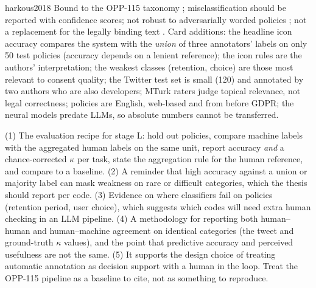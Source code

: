 \begin{papercard}{harkous2018}
 Bound to the OPP-115 taxonomy ; misclassification should be reported with confidence scores; not robust to adversarially worded policies ; not a replacement for the legally binding text . Card additions: the headline icon accuracy compares the system with the \emph{union} of three annotators' labels on only 50 test policies (accuracy depends on a lenient reference); the icon rules are the authors' interpretation; the weakest classes (retention, choice) are those most relevant to consent quality; the Twitter test set is small (120) and annotated by two authors who are also developers; MTurk raters judge topical relevance, not legal correctness; policies are English, web-based and from before GDPR; the neural models predate LLMs, so absolute numbers cannot be transferred.

 (1) The evaluation recipe for stage L: hold out policies, compare machine labels with the aggregated human labels on the same unit, report accuracy \emph{and} a chance-corrected $\kappa$ per task, state the aggregation rule for the human reference, and compare to a baseline. (2) A reminder that high accuracy against a union or majority label can mask weakness on rare or difficult categories, which the thesis should report per code. (3) Evidence on where classifiers fail on policies (retention period, user choice), which suggests which codes will need extra human checking in an LLM pipeline. (4) A methodology for reporting both human--human and human--machine agreement on identical categories (the tweet and ground-truth $\kappa$ values), and the point that predictive accuracy and perceived usefulness are not the same. (5) It supports the design choice of treating automatic annotation as decision support with a human in the loop. Treat the OPP-115 pipeline as a baseline to cite, not as something to reproduce.
\end{papercard}
